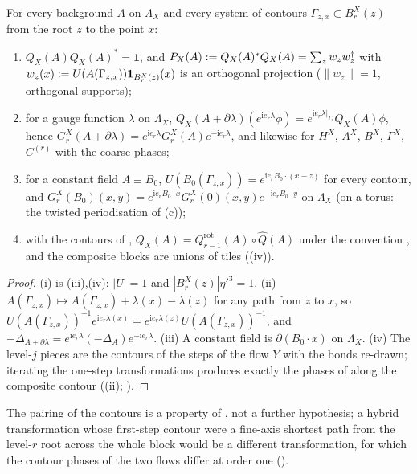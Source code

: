 \begin{lemma}\label{rot:hyb:lem:alg}
For every background $A$ on $\Lambda_X$ and every system of contours $\Gamma_{z,x}\subset B^X_r(z)$ from the root $z$ to the point $x$:
\begin{enumerate}[label=\textup{(\roman*)},leftmargin=*]
\item $Q_X(A)Q_X(A)^*=\mathbf 1$, and $P_X(A):= Q_X(A)^*Q_X(A)=\sum_zw_zw_z^\dagger$ with $w_z(x):= U(A(\Gamma_{z,x}))\mathbf 1_{B^X_r(z)}(x)$ is an orthogonal projection ($\|w_z\|=1$, orthogonal supports);
\item for a gauge function $\lambda$ on $\Lambda_X$, $Q_X(A+\partial\lambda)(e^{\mathrm ie_r\lambda}\phi)=e^{\mathrm ie_r\lambda|_{\Gamma_r}}Q_X(A)\phi$, hence $G^X_r(A+\partial\lambda)=e^{\mathrm ie_r\lambda}G^X_r(A)e^{-\mathrm ie_r\lambda}$, and likewise for $H^X$, $A^X$, $B^X$, $\Gamma^X$, $C^{(r)}$ with the coarse phases;
\item for a constant field $A\equiv B_0$, $U(B_0(\Gamma_{z,x}))=e^{\mathrm ie_rB_0\cdot(x-z)}$ for every contour, and $G^X_r(B_0)(x,y)=e^{\mathrm ie_rB_0\cdot x}G^X_r(0)(x,y)e^{-\mathrm ie_rB_0\cdot y}$ on $\Lambda_X$ (on a torus: the twisted periodisation of (c));
\item with the contours of , $Q_X(A)=Q^{\mathrm{rot}}_{r-1}(A)\circ\hat Q(A)$ under the convention \cite[(2.19)]{K1}, and the composite blocks are unions of tiles ((iv)).
\end{enumerate}
\end{lemma}
\begin{proof}
(i) is (iii),(iv): $|U|=1$ and $|B^X_r(z)|\eta'^3=1$. (ii) $A(\Gamma_{z,x})\mapsto A(\Gamma_{z,x})+\lambda(x)-\lambda(z)$ for any path from $z$ to $x$, so $U(A(\Gamma_{z,x}))^{-1}e^{\mathrm ie_r\lambda(x)}=e^{\mathrm ie_r\lambda(z)}U(A(\Gamma_{z,x}))^{-1}$, and $-\Delta_{A+\partial\lambda}=e^{\mathrm ie_r\lambda}(-\Delta_A)e^{-\mathrm ie_r\lambda}$. (iii) A constant field is $\partial(B_0\cdot x)$ on $\Lambda_X$. (iv) The level-$j$ pieces are the contours of the steps of the flow $Y$ with the bonds re-drawn; iterating the one-step transformations produces exactly the phases of \cite[(2.19)]{K1} along the composite contour ((ii); \cite[(3.33)--(3.34)]{Ba1}).
\end{proof}

The pairing of the contours is a property of , not a further hypothesis; a hybrid transformation whose first-step contour were a fine-axis shortest path from the level-$r$ root across the whole block would be a different transformation, for which the contour phases of the two flows differ at order one ().
